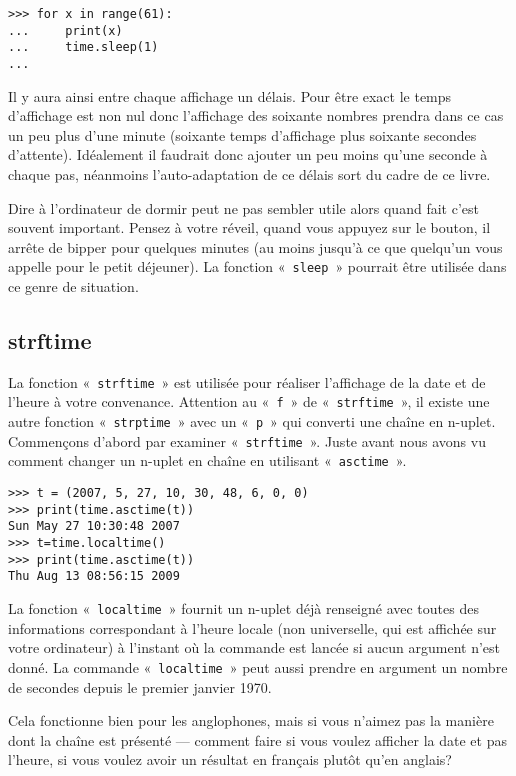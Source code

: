 \begin{Verbatim}[frame=single,rulecolor=\color{gray}]
>>> for x in range(61):
...     print(x)
...     time.sleep(1)
...
\end{Verbatim}
Il y aura ainsi entre chaque affichage un délais. Pour être exact le temps d'affichage est non nul donc l'affichage des soixante nombres prendra dans ce cas un peu plus d'une minute (soixante temps d'affichage plus soixante secondes d'attente). Idéalement il faudrait donc ajouter un peu moins qu'une seconde à chaque pas, néanmoins l'auto-adaptation de ce délais sort du cadre de ce livre.

Dire à l'ordinateur de dormir peut ne pas sembler utile alors quand fait c'est souvent important. Pensez à votre réveil, quand vous appuyez sur le bouton, il arrête de bipper pour quelques minutes (au moins jusqu'à ce que quelqu'un vous appelle pour le petit déjeuner). La fonction «~\texttt{sleep}~» pourrait être utilisée dans ce genre de situation.

\subsection{strftime}

La fonction «~\texttt{strftime}~» est utilisée pour réaliser l'affichage de la date et de l'heure à votre convenance. Attention au «~\texttt{f}~» de «~\texttt{strftime}~», il existe une autre fonction «~\texttt{strptime}~» avec un «~\texttt{p}~» qui converti une chaîne en n-uplet.
Commençons d'abord par examiner «~\texttt{strftime}~».
Juste avant nous avons vu comment changer un n-uplet en chaîne en utilisant «~\texttt{asctime}~».

\begin{Verbatim}[frame=single,rulecolor=\color{gray}]
>>> t = (2007, 5, 27, 10, 30, 48, 6, 0, 0)
>>> print(time.asctime(t))
Sun May 27 10:30:48 2007
>>> t=time.localtime()
>>> print(time.asctime(t))
Thu Aug 13 08:56:15 2009
\end{Verbatim}



La fonction «~\texttt{localtime}~» fournit un n-uplet déjà renseigné avec toutes des informations correspondant à l'heure locale (non universelle, qui est affichée sur votre ordinateur) à l'instant où la commande est lancée si aucun argument n'est donné. La commande «~\texttt{localtime}~» peut aussi prendre en argument un nombre de secondes depuis le premier janvier 1970.   

Cela fonctionne bien pour les anglophones, mais si vous n'aimez pas la manière dont la chaîne est présenté --- comment faire si vous voulez afficher la date et pas l'heure, si vous voulez avoir un résultat en français plutôt qu'en anglais?

